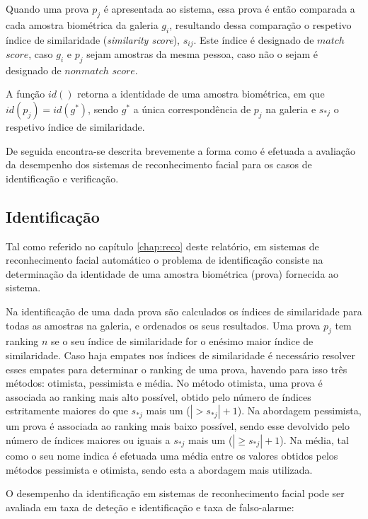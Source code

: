 Quando uma prova $p_j$ é apresentada ao sistema, essa prova é então comparada a cada amostra biométrica da galeria $g_i$, resultando dessa comparação o respetivo índice de similaridade (\textit{similarity score}), $s_{ij}$. Este índice é designado de $match$ $score$, caso $g_i$ e $p_j$ sejam amostras da mesma pessoa, caso não o sejam é designado de $nonmatch$ $score$.

A função $id()$ retorna a identidade de uma amostra biométrica, em que $id(p_j) = id(g^*)$, sendo $g^*$ a única correspondência de $p_j$ na galeria e $s_{*j}$ o respetivo índice de similaridade.

De seguida encontra-se descrita brevemente a forma como é efetuada a avaliação da desempenho dos sistemas de reconhecimento facial para os casos de identificação e verificação.

\subsection{Identificação}
Tal como referido no capítulo \ref{chap:reco} deste relatório, em sistemas de reconhecimento facial automático o problema de identificação consiste na determinação da identidade de uma amostra biométrica (prova) fornecida ao sistema.

Na identificação de uma dada prova são calculados os índices de similaridade para todas as amostras na galeria, e ordenados os seus resultados. Uma prova $p_j$ tem ranking $n$ se o seu índice de similaridade for o enésimo maior índice de similaridade. Caso haja empates nos índices de similaridade é necessário resolver esses empates para determinar o ranking de uma prova, havendo para isso três métodos: otimista, pessimista e média. No método otimista, uma prova é associada ao ranking mais alto possível, obtido pelo número de índices estritamente maiores do que $s_{*j}$ mais um ($|> s_{*j}| + 1$). Na abordagem pessimista, um prova é associada ao ranking mais baixo possível, sendo esse devolvido pelo número de índices maiores ou iguais a $s_{*j}$ mais um ($|\geqslant s_{*j}| + 1$). Na média, tal como o seu nome indica é efetuada uma média entre os valores obtidos pelos métodos pessimista e otimista, sendo esta a abordagem mais utilizada. 

O desempenho da identificação em sistemas de reconhecimento facial pode ser avaliada em taxa de deteção e identificação e taxa de falso-alarme:


